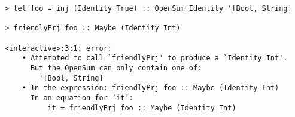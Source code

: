 \begin{repl}\begin{lstlisting}
> let foo = inj (Identity True) :: OpenSum Identity '[Bool, String]

> friendlyPrj foo :: Maybe (Identity Int)

<interactive>:3:1: error:
    • Attempted to call `friendlyPrj' to produce a `Identity Int'.
      But the OpenSum can only contain one of:
        '[Bool, String]
    • In the expression: friendlyPrj foo :: Maybe (Identity Int)
      In an equation for ‘it’:
          it = friendlyPrj foo :: Maybe (Identity Int)\end{lstlisting}\end{repl}
